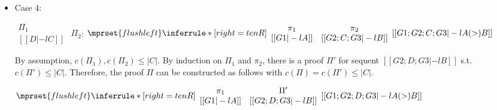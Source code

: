 \begin{itemize}
\item Case 4:
      \begin{center}
        \scriptsize
        \begin{math}
          \begin{array}{c}
            \Pi_1 \\
            {[[D |-l C]]}
          \end{array}
        \end{math}
        \qquad\qquad
        $\Pi_2$:
        \begin{math}
          $$\mprset{flushleft}
          \inferrule* [right={\tiny tenR}] {
            {
              \begin{array}{cc}
                \pi_1 & \pi_2 \\
                {[[G1 |-l A]]} & {[[G2; C; G3 |-l B]]}
              \end{array}
            }
          }{[[G1; G2; C; G3 |-l A (>) B]]}
        \end{math}
      \end{center}
      By assumption, $c(\Pi_1),c(\Pi_2)\leq |C|$. By induction on $\Pi_1$
      and $\pi_2$, there is a proof $\Pi'$ for sequent
      $[[G2; D; G3 |-l B]]$ s.t. $c(\Pi') \leq |C|$. Therefore, the proof
      $\Pi$ can be constructed as follows with $c(\Pi) = c(\Pi') \leq |C|$.
      \begin{center}
        \scriptsize
        \begin{math}
          $$\mprset{flushleft}
          \inferrule* [right={\tiny tenR}] {
            {
              \begin{array}{cc}
                \pi_1 & \Pi' \\
                {[[G1 |-l A]]} & {[[G2; D; G3 |-l B]]}
              \end{array}
            }
          }{[[G1; G2; D; G3 |-l A (>) B]]}
        \end{math}
      \end{center}
\end{itemize}



